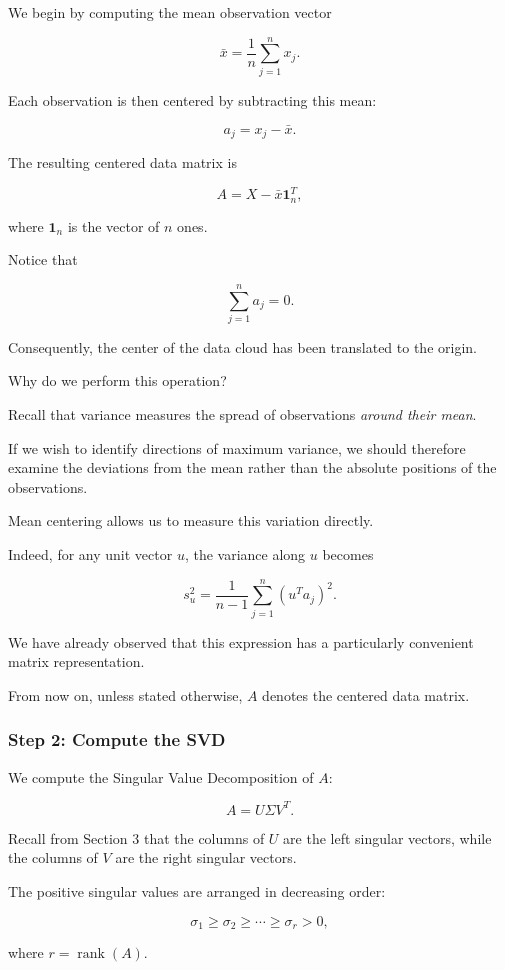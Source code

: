 \documentclass[11pt]{article}
\begin{document}
We begin by computing the mean
observation vector

\[
\bar{x}=
\frac{1}{n}\sum_{j=1}^{n}x_j.
\]

Each observation is then centered
by subtracting this mean:

\[
a_j=x_j-\bar{x}.
\]

The resulting centered data matrix is

\[
\boxed{
A=X-\bar{x}\mathbf{1}_n^T,
}
\]

where $\mathbf{1}_n$ is the vector
of $n$ ones.

Notice that

\[
\sum_{j=1}^{n}a_j=0.
\]

Consequently, the center of the
data cloud has been translated
to the origin.

Why do we perform this operation?

Recall that variance measures
the spread of observations
\textit{around their mean}.

If we wish to identify directions
of maximum variance, we should
therefore examine the deviations
from the mean rather than the
absolute positions of the
observations.

Mean centering allows us to
measure this variation directly.

Indeed, for any unit vector $u$,
the variance along $u$ becomes

\[
s_u^2=
\frac{1}{n-1}
\sum_{j=1}^{n}(u^Ta_j)^2.
\]

We have already observed that this
expression has a particularly
convenient matrix representation.

From now on, unless stated
otherwise, $A$ denotes the
centered data matrix.

\subsubsection*{Step 2: Compute the SVD}

We compute the Singular Value
Decomposition of $A$:

\[
\boxed{
A=U\Sigma V^T.
}
\]

Recall from Section 3 that
the columns of $U$ are
the left singular vectors,
while the columns of $V$
are the right singular vectors.

The positive singular values
are arranged in decreasing order:

\[
\sigma_1\geq\sigma_2
\geq\cdots\geq\sigma_r>0,
\]

where $r=\operatorname{rank}(A)$.
\end{document}
